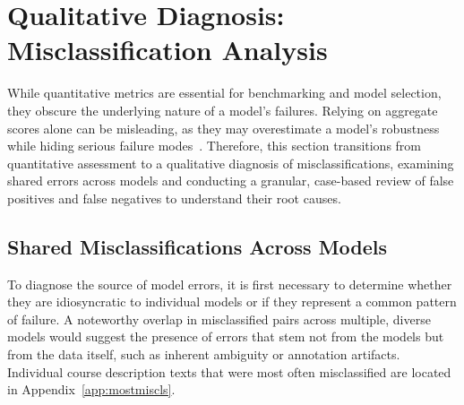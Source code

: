 \section{Qualitative Diagnosis: Misclassification Analysis}\label{ch:4.6}
While quantitative metrics are essential for benchmarking and model selection, they obscure the underlying nature of a model's failures. Relying on aggregate scores alone can be misleading, as they may overestimate a model's robustness while hiding serious failure modes~\cite{gauthier2022}. Therefore, this section transitions from quantitative assessment to a qualitative diagnosis of misclassifications, examining shared errors across models and conducting a granular, case-based review of false positives and false negatives to understand their root causes.

\subsection{Shared Misclassifications Across Models}\label{ch:4.6.1}
To diagnose the source of model errors, it is first necessary to determine whether they are idiosyncratic to individual models or if they represent a common pattern of failure. A noteworthy overlap in misclassified pairs across multiple, diverse models would suggest the presence of errors that stem not from the models but from the data itself, such as inherent ambiguity or annotation artifacts.  Individual course description texts that were most often misclassified are located in Appendix~\ref{app:mostmiscls}.

